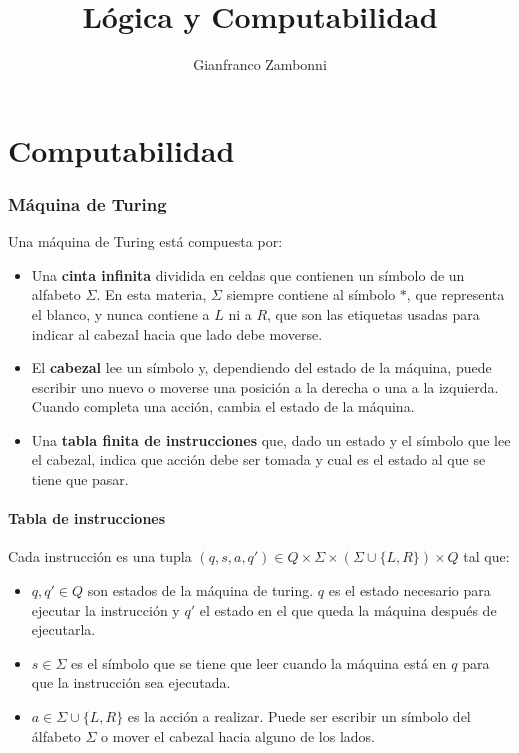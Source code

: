 

\title{Lógica y Computabilidad}
\author{Gianfranco Zambonni}



\newtheorem{definicion}{Definición}[section]
\newtheorem{teorema}{Teorema}[section]
\newtheorem{corolario}{Corolario}[section]

	
	\maketitle
	\tableofcontents
	\newpage
	
	\part{Computabilidad}
	
	\section{Máquina de Turing}
	Una máquina de Turing está compuesta por:

	\begin{itemize}
		\item Una \textbf{cinta infinita}  dividida en celdas que contienen un símbolo de un alfabeto $\Sigma$. En esta materia, $\Sigma$ siempre contiene al símbolo $*$, que representa el blanco, y nunca contiene a $L$ ni a $R$, que son las etiquetas usadas para indicar al cabezal hacia que lado debe moverse.
		\item El \textbf{cabezal} lee un símbolo y, dependiendo del estado de la máquina, puede escribir uno nuevo o moverse una posición a la derecha o una a la izquierda. Cuando completa una acción, cambia el estado de la máquina.
		\item Una \textbf{tabla finita de instrucciones} que, dado un estado y el símbolo que lee el cabezal, indica que acción debe ser tomada y cual es el estado al que se tiene que pasar.
	\end{itemize}

	\subsection{Tabla de instrucciones}
	Cada instrucción es una tupla $(q,s,a,q')\in Q\times\Sigma\times (\Sigma\cup \{L,R\}) \times Q$ tal que:
	\begin{itemize}
		\item $q,q'\in Q$ son estados de la máquina de turing. $q$ es el estado necesario para ejecutar la instrucción y $q'$ el estado en el que queda la máquina después de ejecutarla.
		\item $s\in\Sigma$ es el símbolo que se tiene que leer cuando la máquina está en $q$ para que la instrucción sea ejecutada.
		\item $a\in\Sigma\cup \{L,R\}$ es la acción a realizar. Puede ser escribir un símbolo del álfabeto $\Sigma$ o mover el cabezal hacia alguno de los lados.
	\end{itemize}


